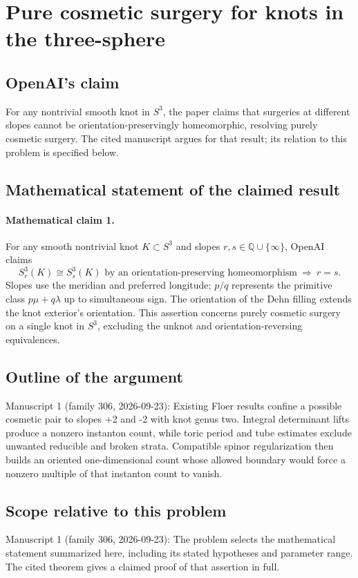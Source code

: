 \documentclass[11pt]{article}
\begin{document}
\section*{Pure cosmetic surgery for knots in the three-sphere}

\subsection{OpenAI's claim}
For any nontrivial smooth knot in \(S^3\), the paper claims that surgeries at different slopes cannot be orientation-preservingly homeomorphic, resolving purely cosmetic surgery. The cited manuscript argues for that result; its relation to this problem is specified below.

\subsection{Mathematical statement of the claimed result}
\paragraph{Mathematical claim 1.} For any smooth nontrivial knot $K\subset S^3$ and slopes $r,s\in\mathbb Q\cup\{\infty\}$, OpenAI claims
\[
S^3_r(K)\cong S^3_s(K)\text{ by an orientation-preserving homeomorphism}\ \Longrightarrow\ r=s.
\]
Slopes use the meridian and preferred longitude; $p/q$ represents the primitive class $p\mu+q\lambda$ up to simultaneous sign. The orientation of the Dehn filling extends the knot exterior's orientation. This assertion concerns purely cosmetic surgery on a single knot in $S^3$, excluding the unknot and orientation-reversing equivalences.

\subsection{Outline of the argument}
Manuscript 1 (family 306, 2026-09-23): Existing Floer results confine a possible cosmetic pair to slopes +2 and -2 with knot genus two. Integral determinant lifts produce a nonzero instanton count, while toric period and tube estimates exclude unwanted reducible and broken strata. Compatible spinor regularization then builds an oriented one-dimensional count whose allowed boundary would force a nonzero multiple of that instanton count to vanish.

\subsection{Scope relative to this problem}
Manuscript 1 (family 306, 2026-09-23): The problem selects the mathematical statement summarized here, including its stated hypotheses and parameter range. The cited theorem gives a claimed proof of that assertion in full.
\end{document}

